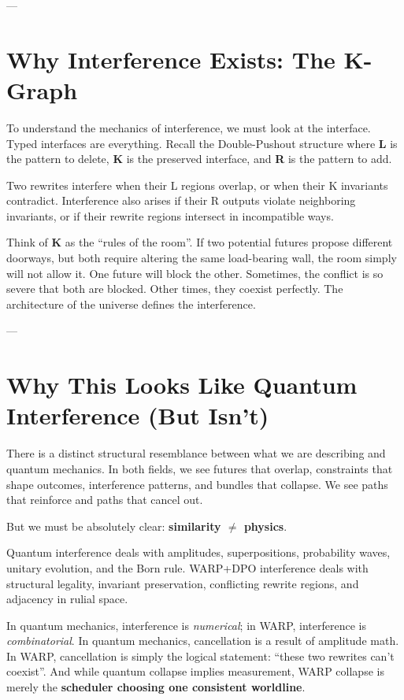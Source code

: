 ---

\section{\texorpdfstring{\textbf{Why Interference Exists: The K-Graph}}{12.7 --- Why Interference Exists: The K-Graph}}

To understand the mechanics of interference, we must look at the interface. Typed interfaces are everything. Recall the Double-Pushout structure where \textbf{L} is the pattern to delete, \textbf{K} is the preserved interface, and \textbf{R} is the pattern to add.

Two rewrites interfere when their L regions overlap, or when their K invariants contradict. Interference also arises if their R outputs violate neighboring invariants, or if their rewrite regions intersect in incompatible ways.

Think of \textbf{K} as the ``rules of the room''. If two potential futures propose different doorways, but both require altering the same load-bearing wall, the room simply will not allow it. One future will block the other. Sometimes, the conflict is so severe that both are blocked. Other times, they coexist perfectly. The architecture of the universe defines the interference.

---

\section{\texorpdfstring{\textbf{Why This Looks Like Quantum Interference (But Isn't)}}{12.8 --- Why This Looks Like Quantum Interference (But Isn't)}}

There is a distinct structural resemblance between what we are describing and quantum mechanics. In both fields, we see futures that overlap, constraints that shape outcomes, interference patterns, and bundles that collapse. We see paths that reinforce and paths that cancel out.

But we must be absolutely clear: \textbf{similarity $\neq$ physics}.

Quantum interference deals with amplitudes, superpositions, probability waves, unitary evolution, and the Born rule. WARP+DPO interference deals with structural legality, invariant preservation, conflicting rewrite regions, and adjacency in rulial space.

In quantum mechanics, interference is \textit{numerical}; in WARP, interference is \textit{combinatorial}. In quantum mechanics, cancellation is a result of amplitude math. In WARP, cancellation is simply the logical statement: ``these two rewrites can't coexist''. And while quantum collapse implies measurement, WARP collapse is merely the \textbf{scheduler choosing one consistent worldline}.

